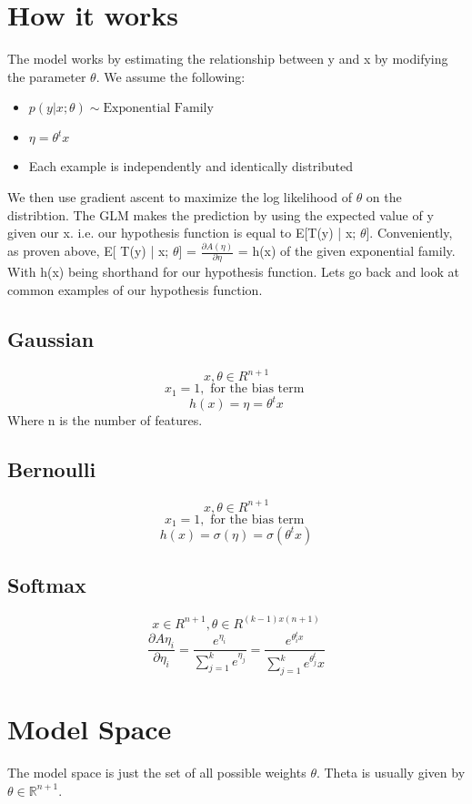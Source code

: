 \documentclass{article}
\newcommand{\R}{\mathbb{R}}
\newcommand{\pard}[2]{\frac{\partial {#1}}{\partial {#2}}}
\begin{document}
\section{How it works}

The model works by estimating the relationship between y and x by modifying the parameter $\theta$.
We assume the following:
\begin{itemize}
    \item $p(y|x;\theta) \sim \text{Exponential Family}$
    \item $\eta = \theta^t x$
    \item Each example is independently and identically distributed
\end{itemize}
We then use gradient ascent to maximize the log likelihood of $\theta$ on the distribtion. 
The GLM makes the prediction by using the expected value of y given our x. i.e. our hypothesis function is equal to E[T(y) | x; $\theta$]. 
Conveniently, as proven above, E[ T(y) | x; $\theta$] = $\pard{A(\eta)}{\eta}$ = h(x) of the given exponential family. 
With h(x) being shorthand for our hypothesis function. 
Lets go back and look at common examples of our hypothesis function.  
\subsection{Gaussian}
$$x,\theta \in R^{n+1}$$
$$x_1 = 1, \text{ for the bias term }$$
$$h(x) = \eta = \theta^t x$$
Where n is the number of features.
\subsection{Bernoulli}
$$x,\theta \in R^{n+1}$$
$$x_1 = 1, \text{ for the bias term }$$
$$h(x) = \sigma(\eta) = \sigma(\theta^t x )$$
\subsection{Softmax}
$$x \in R^{n+1}, \theta \in R^{(k -  1) x (n + 1)}$$
$$\pard{A{\eta_i}}{\eta_i} = \frac{e^{\eta_i}}{\sum_{j=1}^{k}e^{\eta_j}} = \frac{e^{\theta_i^t x}}{\sum_{j=1}^{k}e^{\theta_j^t} x}$$



\section{Model Space}

The model space is just the set of all possible weights $\theta$. 
Theta is usually given by $\theta \in \R^{n+1}$.
\end{document}
